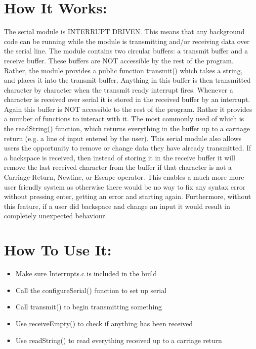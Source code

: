 \documentclass[]{report}
\begin{document}
\section{How It Works:}
The serial module is INTERRUPT DRIVEN. This means that any background code can be running while the module is transmitting and/or receiving data over the serial line. \newline
The module contains two circular buffers: a transmit buffer and a receive buffer. These buffers are NOT accessible by the rest of the program. Rather, the module provides a public function transmit() which takes a string, and places it into the transmit buffer. Anything in this buffer is then transmitted character by character when the transmit ready interrupt fires. \newline
Whenever a character is received over serial it is stored in the received buffer by an interrupt. Again this buffer is NOT accessible to the rest of the program. Rather it provides a number of functions to interact with it. The most commonly used of which is the readString() function, which returns everything in the buffer up to a carriage return (e.g. a line of input entered by the user). \newline
This serial module also allows users the opportunity to remove or change data they have already transmitted. If a backspace is received, then instead of storing it in the receive buffer it will remove the last received character from the buffer if that character is not a Carriage Return, Newline, or Escape operator. This enables a much more more user friendly system as otherwise there would be no way to fix any syntax error without pressing enter, getting an error and starting again. Furthermore, without this feature, if a user did backspace and change an input it would result in completely unexpected behaviour.

\section{How To Use It:}
\begin{itemize}
	\item Make sure Interrupts.c is included in the build
	\item Call the configureSerial() function to set up serial
	\item Call transmit() to begin transmitting something
	\item Use receiveEmpty() to check if anything has been received
	\item Use readString() to read everything received up to a carriage return
\end{itemize}
\end{document}

